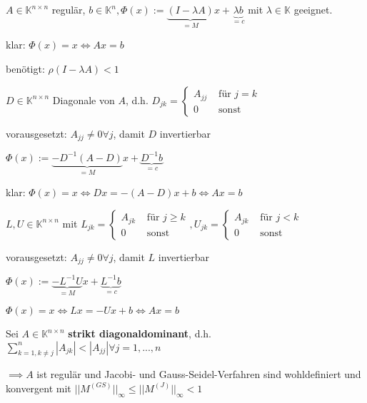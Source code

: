 \begin{example}
	$A \in \mathbb{K}^{n \times n}$ regulär, $b \in \mathbb{K}^n, \Phi(x) := \underbrace{(I-\lambda A)}_{=M}x + \underbrace{\lambda b}_{=c}$ mit $\lambda \in \mathbb{K}$ geeignet.
	
	klar: $\Phi(x) = x \iff Ax = b$ 
	
	benötigt: $\rho(I-\lambda A) < 1$
\end{example}

\begin{example}
	$D \in \mathbb{K}^{n\times n}$ Diagonale von $A$, d.h. $D_{jk} = \begin{cases}
		A_{jj} & \text{ für } j = k\\
		0 & \text{ sonst}
	\end{cases}$
	
	vorausgesetzt: $A_{jj} \neq 0 \forall j$, damit $D$ invertierbar
	
	$\Phi(x) := \underbrace{-D^{-1}(A-D)}_{=M}x + \underbrace{D^{-1}b}_{=c}$
	
	klar: $\Phi(x) = x \iff Dx = -(A-D)x + b \iff Ax=b$
\end{example}

\begin{example}
	$L,U \in \mathbb{K}^{n\times n}$ mit $L_{jk} = \begin{cases}
		A_{jk} & \text{ für } j \geq k\\
		0 & \text{ sonst}
	\end{cases}, U_{jk} = \begin{cases}
		A_{jk} & \text{ für } j < k\\
		0 & \text{ sonst}
	\end{cases}$
	
	vorausgesetzt: $A_{jj} \neq 0 \forall j$, damit $L$ invertierbar
	
	$\Phi(x) := \underbrace{-L^{-1}U}_{=M}x + \underbrace{L^{-1}b}_{=c}$
	
	$\Phi(x) = x \iff Lx = -Ux + b \iff Ax = b$
\end{example}

\begin{theorem}
	Sei $A \in \mathbb{K}^{n\times n}$ \textbf{strikt diagonaldominant}, d.h. $\sum_{k=1, k\neq j}^{n} |A_{jk}| < |A_{jj}| \forall j=1, ..., n$
	
	$\implies A$ ist regulär und Jacobi- und Gauss-Seidel-Verfahren sind wohldefiniert und konvergent mit $||M^{(GS)}||_\infty \leq ||M^{(J)}||_\infty < 1$
\end{theorem}


